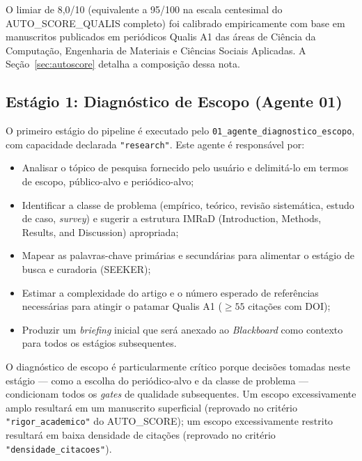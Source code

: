 O limiar de 8,0/10 (equivalente a 95/100 na escala centesimal do
AUTO\_SCORE\_QUALIS completo) foi calibrado empiricamente com base
em manuscritos publicados em periódicos Qualis A1 das áreas de
Ciência da Computação, Engenharia de Materiais e Ciências Sociais
Aplicadas. A Seção~\ref{sec:autoscore} detalha a composição dessa
nota.

\subsection{Estágio 1: Diagnóstico de Escopo (Agente 01)}
\label{sec:estagio1}

O primeiro estágio do pipeline é executado pelo
\texttt{01\_agente\_diagnostico\_escopo}, com capacidade declarada
\texttt{"research"}. Este agente é responsável por:

\begin{itemize}
    \item Analisar o tópico de pesquisa fornecido pelo usuário e
    delimitá-lo em termos de escopo, público-alvo e periódico-alvo;

    \item Identificar a classe de problema (empírico, teórico,
    revisão sistemática, estudo de caso, \textit{survey}) e sugerir
    a estrutura IMRaD (Introduction, Methods, Results, and
    Discussion) apropriada;

    \item Mapear as palavras-chave primárias e secundárias para
    alimentar o estágio de busca e curadoria (SEEKER);

    \item Estimar a complexidade do artigo e o número esperado de
    referências necessárias para atingir o patamar Qualis A1
    ($\geq 55$ citações com DOI);

    \item Produzir um \textit{briefing} inicial que será anexado ao
    \textit{Blackboard} como contexto para todos os estágios
    subsequentes.
\end{itemize}

O diagnóstico de escopo é particularmente crítico porque decisões
tomadas neste estágio — como a escolha do periódico-alvo e da
classe de problema — condicionam todos os \textit{gates} de
qualidade subsequentes. Um escopo excessivamente amplo resultará em
um manuscrito superficial (reprovado no critério
\texttt{"rigor\_academico"} do AUTO\_SCORE); um escopo
excessivamente restrito resultará em baixa densidade de citações
(reprovado no critério \texttt{"densidade\_citacoes"}).

